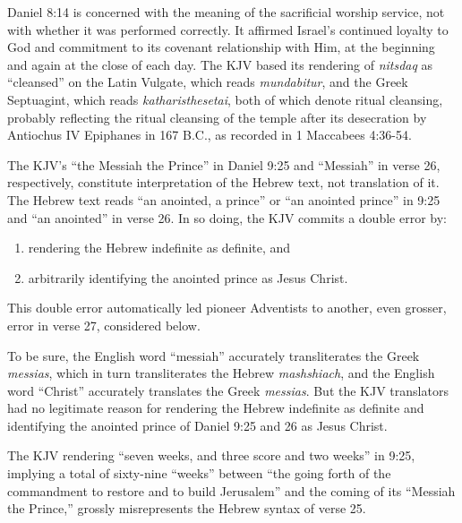Daniel 8:14 is concerned with the meaning of the sacrificial worship
service, not with whether it was performed correctly. It affirmed Israel's
continued loyalty to God and commitment to its covenant relationship with
Him, at the beginning and again at the close of each day. The KJV based its
rendering of \textit{nitsdaq} as ``cleansed'' on the Latin Vulgate, which reads
\textit{mundabitur}, and the Greek Septuagint, which reads \textit{katharisthesetai}, both of
which denote ritual cleansing, probably reflecting the ritual cleansing of
the temple after its desecration by Antiochus IV Epiphanes in 167 B.C., as
recorded in 1 Maccabees 4:36-54.

The KJV's ``the Messiah the Prince'' in Daniel 9:25 and ``Messiah'' in verse 26,
respectively, constitute interpretation of the Hebrew text, not translation
of it. The Hebrew text reads ``an anointed, a prince'' or ``an anointed prince''
in 9:25 and ``an anointed'' in verse 26. In so doing, the KJV commits a double
error by: 
\begin{enumerate}
	\item rendering the Hebrew indefinite as definite, and 
	\item arbitrarily identifying the anointed prince as Jesus Christ.
\end{enumerate}
This double
error automatically led pioneer Adventists to another, even grosser, error
in verse 27, considered below.

To be sure, the English word ``messiah'' accurately transliterates the Greek
\textit{messias}, which in turn transliterates the Hebrew \textit{mashshiach}, and the English
word ``Christ'' accurately translates the Greek \textit{messias}. But the KJV
translators had no legitimate reason for rendering the Hebrew indefinite as 
definite and identifying the anointed prince of Daniel 9:25 and 26 as Jesus
Christ.

The KJV rendering ``seven weeks, and three score and two weeks'' in 9:25,
implying a total of sixty-nine ``weeks'' between ``the going forth of the
commandment to restore and to build Jerusalem'' and the coming of its
``Messiah the Prince,'' grossly misrepresents the Hebrew syntax of verse 25.

